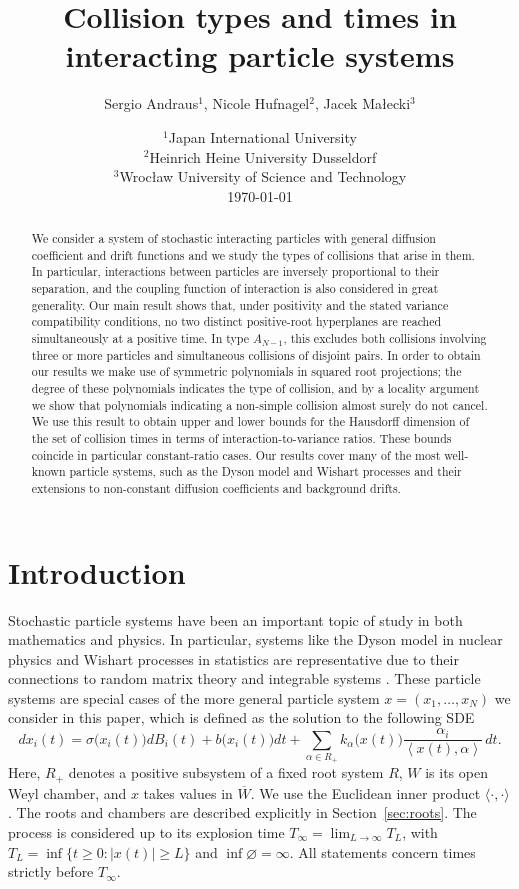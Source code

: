 \documentclass{article}
\title{Collision types and times in interacting particle systems}
\author{Sergio Andraus$^1$, Nicole Hufnagel$^2$, Jacek Małecki$^3$}
\date{
	$^1$Japan International University\\%
	$^2$Heinrich Heine University Dusseldorf\\
	$^3$Wrocław University of Science and Technology\\[2ex]%
	\today}
\numberwithin{equation}{section}
\newcommand{\C}{W}
\newcommand{\Cc}{\overline{W}}
\newcommand{\xta}{\left<x(t),\alpha\right>}
\newcommand{\SaR}{\sum_{\alpha\in R_+}}
\theoremstyle{plain}
\begin{document}
\maketitle

\begin{abstract}
    We consider a system of stochastic interacting particles with general diffusion coefficient and drift functions and we study the types of collisions that arise in them.
    In particular, interactions between particles are inversely proportional to their separation, and the coupling function of interaction is also considered in great generality.    Our main result shows that, under positivity and the stated variance compatibility conditions, no two distinct positive-root hyperplanes are reached simultaneously at a positive time. In type $A_{N-1}$, this excludes both collisions involving three or more particles and simultaneous collisions of disjoint pairs.
    In order to obtain our results we make use of symmetric polynomials in squared root projections;
    the degree of these polynomials indicates the type of collision, and by a locality argument we show that polynomials indicating a non-simple collision almost surely do not cancel. We use this result to obtain upper and lower bounds for the Hausdorff dimension of the set of collision times in terms of interaction-to-variance ratios. These bounds coincide in particular constant-ratio cases.
    Our results cover many of the most well-known particle systems, such as the Dyson model and Wishart processes and their extensions to non-constant diffusion coefficients and background drifts.
\end{abstract}

\section{Introduction}

Stochastic particle systems have been an important topic of study in both mathematics and physics. In particular, systems like the Dyson model in nuclear physics \cite{Dyson62A} and Wishart processes in statistics \cite{Bru91} are representative due to their connections to random matrix theory and integrable systems \cite{KatoriTanemura04, Forrester10}. These particle systems are special cases of the more general particle system $x = (x_1,\ldots,x_N)$ we consider in this paper, which is defined as the solution to the following SDE
\begin{equation}
	\label{eq:x:SDE}
	dx_i(t) = \sigma\big(x_i(t)\big)dB_i(t)+b\big(x_i(t)\big)dt+\SaR k_{\alpha}\big(x(t)\big)\dfrac{\alpha_i}{\xta} \,dt.
\end{equation}
Here, $R_+$ denotes a positive subsystem of a fixed root system $R$, $\C$ is its open Weyl chamber, and $x$ takes values in $\Cc$. We use the Euclidean inner product $\langle\cdot,\cdot\rangle$. The roots and chambers are described explicitly in Section~\ref{sec:roots}. The process is considered up to its explosion time $T_\infty=\lim_{L\to\infty}T_L$, with $T_L=\inf\{t\geq0:|x(t)|\geq L\}$ and $\inf\varnothing=\infty$. All statements concern times strictly before $T_\infty$.
\end{document}
